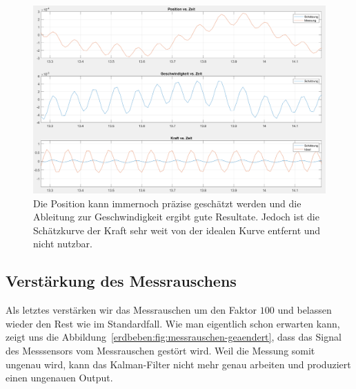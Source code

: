 \begin{figure}
	\begin{center}
		\includegraphics[width=\linewidth,keepaspectratio]{papers/erdbeben/Prozessrauschen_geaendert_zoom.PNG}
		\caption{Die Position kann immernoch präzise geschätzt werden und die Ableitung zur Geschwindigkeit ergibt gute Resultate. Jedoch ist die Schätzkurve der Kraft sehr weit von der idealen Kurve entfernt und nicht nutzbar.}
		\label{erdbeben:fig:prozessrauschen-geaendert-zoom}
	\end{center}
\end{figure}

\subsection{Verstärkung des Messrauschens}
Als letztes verstärken wir das Messrauschen um den Faktor $100$ und belassen wieder den Rest wie im Standardfall.
Wie man eigentlich schon erwarten kann, zeigt uns die Abbildung~\ref{erdbeben:fig:messrauschen-geaendert}, dass das Signal des Messsensors vom Messrauschen gestört wird.
Weil die Messung somit ungenau wird, kann das Kalman-Filter nicht mehr genau arbeiten und produziert einen ungenauen Output.


